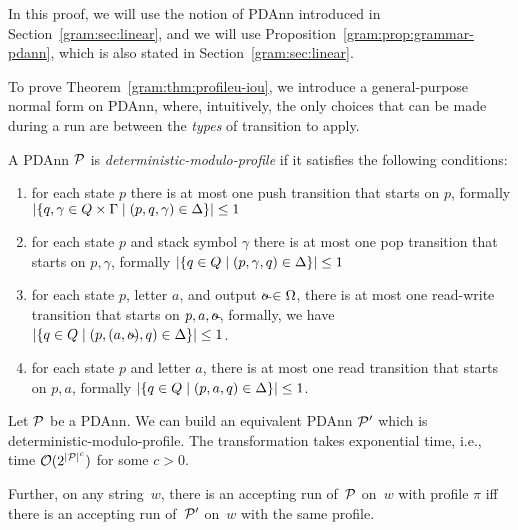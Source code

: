 In this proof, we will use the notion of PDAnn introduced in
Section~\ref{gram:sec:linear}, and we will use 
Proposition~\ref{gram:prop:grammar-pdann}, which is also stated in
Section~\ref{gram:sec:linear}.

%

%
%
%
%
%
%
%
%
%
%
%
%

To prove Theorem~\ref{gram:thm:profileu-iou}, we introduce a general-purpose normal form on PDAnn, where,
intuitively, the only choices that can be made during a run are between the \emph{types}
of transition to apply. 

\begin{definition}
  A PDAnn $\mathcal{P}$ is \emph{deterministic-modulo-profile} if it satisfies the following conditions:

  \begin{enumerate}
    \item for each state $p$ there is at most one push transition that
      starts on $p$, formally $\left|\{q, \gamma \in Q \times \Gamma \mid
      (p, q, \gamma) \in \Delta\}\right| \leq 1$
    \item for each state $p$ and stack symbol $\gamma$ there is at most
      one pop transition that starts on $p,\gamma$, formally $\left|\{q
      \in Q \mid (p, \gamma, q) \in \Delta\}\right| \leq 1$
    \item for each state $p$, letter $a$, and output $\oout \in \Omega$, there is at most one read-write transition that starts on
      $p,a,\oout$, formally, we have $\card{\{q \in Q \mid (p,(a,\oout),q) \in \Delta\}}
      \leq 1$.
      \item for each state $p$ and letter $a$, there is at most one read transition that starts on
      $p,a$, formally $\left|\{q \in Q \mid (p,a,q) \in \Delta\}\right|
      \leq 1$.
  \end{enumerate}
\end{definition}

\begin{lemma}\label{gram:lem:pdtonechoice}
        Let $\mathcal{P}$ be a PDAnn. We can build an equivalent PDAnn $\mathcal{P}'$ which is
        deterministic-modulo-profile. The transformation takes exponential time,
        i.e., time $\mathcal{O}(2^{|\mathcal{P}|^c})$ for some $c > 0$.

        Further, on any string~$w$, there is an accepting run of~$\mathcal{P}$ on~$w$ with
        profile $\pi$ iff there is an accepting run of~$\mathcal{P}'$ on~$w$ with the same profile.
\end{lemma}

